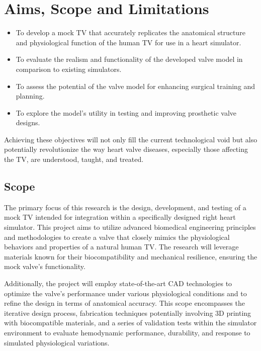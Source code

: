 \section{Aims, Scope and Limitations}
\begin{itemize}
    \item To develop a mock \gls{TV} that accurately replicates the anatomical structure and physiological function of the human \gls{TV} for use in a heart simulator.
\end{itemize}
\begin{itemize}
    \item To evaluate the realism and functionality of the developed valve model in comparison to existing simulators.
    \item To assess the potential of the valve model for enhancing surgical training and planning.
    \item To explore the model's utility in testing and improving prosthetic valve designs.
\end{itemize}
Achieving these objectives will not only fill the current technological void but also potentially revolutionize the way heart valve diseases, especially those affecting the \gls{TV}, are understood, taught, and treated.

\subsection{Scope}

The primary focus of this research is the design, development, and testing of a mock \gls{TV} intended for integration within a specifically designed right heart simulator. This project aims to utilize advanced biomedical engineering principles and methodologies to create a valve that closely mimics the physiological behaviors and properties of a natural human \gls{TV}. The research will leverage materials known for their biocompatibility and mechanical resilience, ensuring the mock valve's functionality.

Additionally, the project will employ state-of-the-art \gls{CAD} technologies to optimize the valve's performance under various physiological conditions and to refine the design in terms of anatomical accuracy. This scope encompasses the iterative design process, fabrication techniques potentially involving 3D printing with biocompatible materials,   and a series of validation tests within the simulator environment to evaluate hemodynamic performance, durability, and response to simulated physiological variations.

